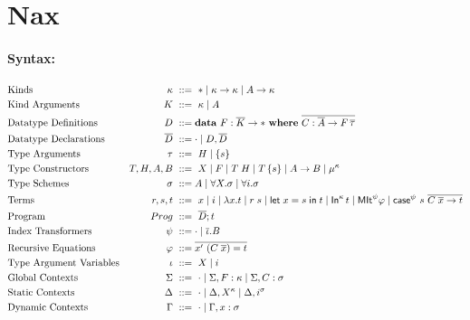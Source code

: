 \section{Nax}

\paragraph{Syntax:}
\begin{align*}
&\text{Kinds}
	& \kappa	&~ ::= ~ * \mid \kappa -> \kappa \mid A -> \kappa
 \\
&\text{Kind Arguments}
	& K		&~ ::= ~ \kappa \mid A
 \\
&\text{Datatype Definitions}
	& D		&~ ::= \mathbf{data}~ F : \overline{K} -> *
                             ~ \mathbf{where} ~
                               \overline{C : \overline{A} -> F\,\overline{\tau}}
 \\
&\text{Datatype Declarations}
	& \overline{D}	&~ ::= \cdot \mid D,\overline{D}
 \\
&\text{Type Arguments}
	& \tau		&~ ::= ~ H \mid \{s\}
 \\
&\text{Type Constructors}
	& T,H,A,B	&~ ::= ~ X \mid F
			   \mid T\;H \mid T\,\{s\}
			   \mid A -> B
			   \mid \mu^\kappa
 \\
&\text{Type Schemes}
	& \sigma	&~ ::= A
			   \mid \forall X.\sigma
			   \mid \forall i.\sigma
 \\
&\text{Terms}
	& r,s,t		&~ ::= ~ x \mid i
			   \mid \lambda x.t \mid r\;s \mid \mathsf{let}\;x = s\;\mathsf{in}\; t
			   \mid \mathsf{In}^\kappa\,t
			   \mid \mathsf{MIt}^\psi \varphi 
			   \mid \mathsf{case}^\psi~s~\overline{C\;\overline{x} -> t}
 \\
&\text{Program}
	& Prog		&~ ::= ~ \overline{D};t
 \\
&\text{Index Transformers}
	& \psi		&~ ::= \cdot \mid \overline\iota . B
 \\
&\text{Recursive Equations}
	& \varphi	&~ ::= \overline{x' ~ (C\;\overline{x}) = t}
 \\
&\text{Type Argument Variables}
	& \iota		&~ ::= ~ X \mid i
 \\
&\text{Global Contexts}
	& \Sigma		&~ ::= ~ \cdot
				\mid \Sigma, F: \kappa \mid \Sigma, C: \sigma
 \\
&\text{Static Contexts}
	& \Delta		&~ ::= ~ \cdot
				\mid \Delta, X^\kappa
				\mid \Delta, i^\sigma
 \\
&\text{Dynamic Contexts}
	& \Gamma		&~ ::= ~ \cdot
				\mid \Gamma, x : \sigma
\end{align*}

